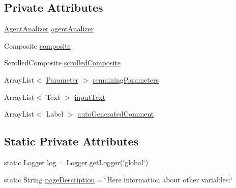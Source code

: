 \subsection*{Private Attributes}
\begin{DoxyCompactItemize}
\item 
\hyperlink{classit_1_1isislab_1_1masonhelperdocumentation_1_1analizer_1_1_agent_analizer}{Agent\-Analizer} \hyperlink{classit_1_1isislab_1_1masonhelperdocumentation_1_1mason_1_1wizards_1_1_f___agent_variables_page_a6914bf26495bed37e500cc1ee50fdc50}{agent\-Analizer}
\item 
Composite \hyperlink{classit_1_1isislab_1_1masonhelperdocumentation_1_1mason_1_1wizards_1_1_f___agent_variables_page_a9b95e0b06f6e0d96b7497478df0e5960}{composite}
\item 
Scrolled\-Composite \hyperlink{classit_1_1isislab_1_1masonhelperdocumentation_1_1mason_1_1wizards_1_1_f___agent_variables_page_a95b20ea3356cda7bd73e9507e43859eb}{scrolled\-Composite}
\item 
Array\-List$<$ \hyperlink{classit_1_1isislab_1_1masonhelperdocumentation_1_1analizer_1_1_parameter}{Parameter} $>$ \hyperlink{classit_1_1isislab_1_1masonhelperdocumentation_1_1mason_1_1wizards_1_1_f___agent_variables_page_ade36fab1c0254d3ac94c077a06fb75f2}{remaining\-Parameters}
\item 
Array\-List$<$ Text $>$ \hyperlink{classit_1_1isislab_1_1masonhelperdocumentation_1_1mason_1_1wizards_1_1_f___agent_variables_page_a56e56862c30449ec5c07b8ac33d3b19f}{input\-Text}
\item 
Array\-List$<$ Label $>$ \hyperlink{classit_1_1isislab_1_1masonhelperdocumentation_1_1mason_1_1wizards_1_1_f___agent_variables_page_a40035836d72bb86df98d0bb6035afb91}{auto\-Generated\-Comment}
\end{DoxyCompactItemize}
\subsection*{Static Private Attributes}
\begin{DoxyCompactItemize}
\item 
static Logger \hyperlink{classit_1_1isislab_1_1masonhelperdocumentation_1_1mason_1_1wizards_1_1_f___agent_variables_page_afcb4c85e4eeb18c009ff3b449a36c6de}{log} = Logger.\-get\-Logger(\char`\"{}global\char`\"{})
\item 
static String \hyperlink{classit_1_1isislab_1_1masonhelperdocumentation_1_1mason_1_1wizards_1_1_f___agent_variables_page_aaf49b0ed7a55f4471af1c729f1371b56}{page\-Description} = \char`\"{}Here information about other variables\-:\char`\"{}
\end{DoxyCompactItemize}



